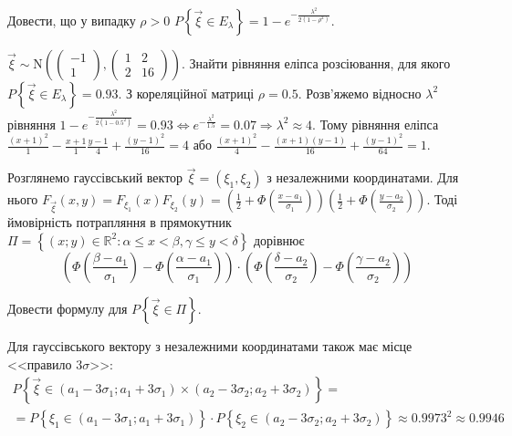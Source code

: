 \begin{exercise}
    Довести, що у випадку $\rho > 0$ $P\left\{\vec{\xi} \in E_\lambda\right\} = 
    1 - e^{-\frac{\lambda^2}{2(1-\rho^2)}}$.
\end{exercise}

\begin{example}
    $\vec{\xi} \sim \mathrm{N}\left( \begin{pmatrix}
        -1 \\ 1
    \end{pmatrix}, \begin{pmatrix}
        1 & 2 \\
        2 & 16
    \end{pmatrix}\right)$. Знайти рівняння еліпса розсіювання, для якого \\
    $P\left\{\vec{\xi} \in E_\lambda\right\} = 0.93$. З кореляційної матриці $\rho = 0.5$.
    Розв'яжемо відносно $\lambda^2$ рівняння $1 - e^{-\frac{\lambda^2}{2(1-0.5^2)}} = 0.93
    \Leftrightarrow e^{-\frac{\lambda^2}{1.5}} = 0.07 \Rightarrow \lambda^2 \approx 4$. Тому рівняння еліпса
    $\frac{(x+1)^2}{1} - \frac{x+1}{1} \frac{y-1}{4} + \frac{(y-1)^2}{16} = 4$ або 
    $\frac{(x+1)^2}{4} - \frac{(x+1)(y-1)}{16} + \frac{(y-1)^2}{64} = 1$.
\end{example}

Розглянемо гауссівський вектор $\vec{\xi} = (\xi_1, \xi_2)$ з незалежними координатами.
Для нього $F_{\vec{\xi}}(x,y) = F_{\xi_1}(x) F_{\xi_2}(y) = 
\left(\frac{1}{2} + \Phi\left( \frac{x-a_1}{\sigma_1}\right) \right)
\left(\frac{1}{2} + \Phi\left( \frac{y-a_2}{\sigma_2}\right) \right)$.
Тоді ймовірність потрапляння в прямокутник $\Pi = \left\{(x;y)\in\mathbb{R}^2 : \alpha \leq x < \beta, \gamma \leq y < \delta\right\}$
дорівнює $$\left( \Phi\left( \frac{\beta-a_1}{\sigma_1}\right) - \Phi\left( \frac{\alpha-a_1}{\sigma_1}\right)\right) \cdot
\left( \Phi\left( \frac{\delta-a_2}{\sigma_2}\right) - \Phi\left( \frac{\gamma-a_2}{\sigma_2}\right)\right)$$
\begin{exercise}
    Довести формулу для $P\left\{\vec{\xi}\in\Pi\right\}$.
\end{exercise}
Для гауссівського вектору з незалежними координатами також має місце <<правило $3\sigma$>>:
\begin{gather*}
    P\left\{\vec{\xi} \in (a_1-3\sigma_1; a_1+3\sigma_1)\times(a_2-3\sigma_2; a_2+3\sigma_2)\right\} = \\
    = P\left\{\xi_1 \in(a_1-3\sigma_1; a_1+3\sigma_1)\right\}\cdot P\left\{\xi_2 \in(a_2-3\sigma_2; a_2+3\sigma_2)\right\}
    \approx 0.9973^2 \approx 0.9946
\end{gather*}

